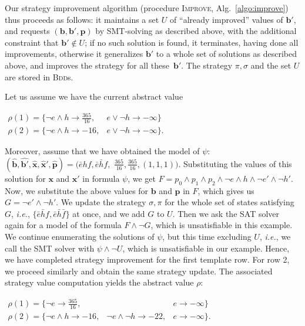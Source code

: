 \documentclass{llncs}
\newcommand{\instance}[1]{\hat{#1}}
\newcommand{\ie}{\textit{i.e.}}
\renewcommand{\vec}[1]{{\boldsymbol #1}}
\newcommand{\verr}{\mathit{e}} \newcommand{\vheat}{\mathit{h}} \newcommand{\vfan}{\mathit{f}}
\begin{document}
Our strategy improvement algorithm (procedure \textsc{Improve},
Alg.~\ref{algo:improve}) thus proceeds as follows: it maintains a set
$U$ of ``already improved'' values of $\vec{b}'$, and requests
$(\vec{b},\vec{b}',\vec{p})$ by SMT-solving as described above, with
the additional constraint that $\vec{b}' \notin U$; if no such
solution is found, it terminates, having done all improvements,
otherwise it generalizes $\vec{b}'$ to a whole set of solutions as
described above, and improves the strategy for all
these~$\vec{b}'$. The strategy $\pi,\sigma$ and the set $U$ are stored
in \textsc{Bdd}s.

\begin{example*}
Let us assume we have the current abstract value\\
\centerline{$
\begin{array}{ll}
\rho(1)=\{\neg\verr\wedge\vheat \rightarrow \frac{365}{16}, &\verr\vee \neg\vheat\rightarrow -\infty\}\\
\rho(2)=\{\neg\verr\wedge\vheat \rightarrow -16, &\verr\vee \neg\vheat\rightarrow -\infty\}.
\end{array}
$}
Moreover, assume that we have obtained the model of
$\psi$: 
$(\instance{\vec{b}},\instance{\vec{b}'},\instance{\vec{x}},\instance{\vec{x}}',\instance{\vec{p}})=
(\bar{\verr}\vheat\vfan,\bar{\verr}\bar{\vheat}\vfan,$ $\frac{365}{16},\frac{365}{16},(1,1,1))$.
Substituting the values of this solution for $\vec{x}$ and $\vec{x}'$ in formula
$\psi$, we get 
$F=p_0\wedge p_1\wedge p_2\wedge \neg\verr \wedge \vheat\wedge
\neg\verr' \wedge \neg\vheat'$.  
Now, we substitute the above values for $\vec{b}$ and $\vec{p}$ in $F$,
which gives us $G=\neg\verr' \wedge \neg\vheat'$. We update the strategy
$\sigma,\pi$ for
the whole set of states satisfying $G$, \ie,
$\{\bar{\verr}\bar{\vheat}\vfan,\bar{\verr}\bar{\vheat}\bar{\vfan}\}$
at once, and we add $G$ to $U$.
Then we ask the SAT solver again for a model of the formula
$F\wedge\neg G$, which is unsatisfiable in this example.
We continue enumerating the solutions of $\psi$, but this time 
excluding $U$, \ie, we call the SMT solver with $\psi\wedge\neg U$, 
which is unsatisfiable in our example. Hence, we have completed 
strategy improvement for the first template row.
For row 2, we proceed similarly and obtain the same strategy update.
The associated strategy value computation yields the abstract value
$\rho$:\\[0.6ex]
\centerline{$
\begin{array}{lll}
\rho(1)=\{\neg\verr \rightarrow \frac{365}{16}, &&\verr\rightarrow -\infty\}\\
\rho(2)=\{\neg\verr\wedge\vheat \rightarrow -16, &\neg\verr\wedge \neg\vheat \rightarrow -22, &\verr\rightarrow -\infty\}.
\end{array}
$}
\end{example*}
\end{document}
